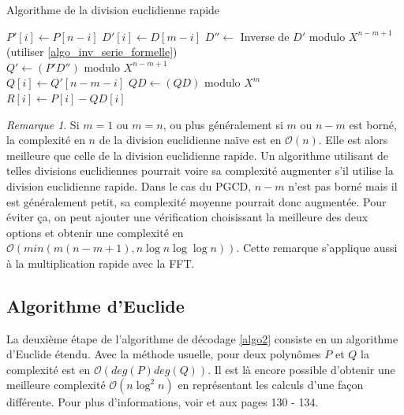 \documentclass{article}
\theoremstyle{definition}
\theoremstyle{remark}
\newtheorem{remark}{Remarque}
\begin{document}
\vspace{0.5cm}

\begin{algorithm}[H]
\label{algo_div_euc_rapide}
\caption{Algorithme de la division euclidienne rapide \cite{inv_formal_series}}
{
    $P'[i] \gets P[n-i]$
}
{
    $D'[i] \gets D[m-i]$
}
$D'' \gets$ Inverse de $D'$ modulo $X^{n-m+1}$ (utiliser \ref{algo_inv_serie_formelle})\\
$Q' \gets (P' D'')$ modulo $X^{n-m+1}$\\
{
    $Q[i] \gets Q'[n-m-i]$
}
$QD \gets (Q D)$ modulo $X^m$\\
{
    $R[i] \gets P[i] - QD[i]$
}
\end{algorithm}

\vspace{0.5cm}

\begin{remark}
    Si $m = 1$ ou $m = n$, ou plus généralement si $m$ ou $n-m$ est borné, la complexité en $n$ de la division euclidienne naïve est en $\mathcal{O}(n)$. Elle est alors meilleure que celle de la division euclidienne rapide. Un algorithme utilisant de telles divisions euclidiennes pourrait voire sa complexité augmenter s'il utilise la division euclidienne rapide. Dans le cas du PGCD, $n-m$ n'est pas borné mais il est généralement petit, sa complexité moyenne pourrait donc augmentée. Pour éviter ça, on peut ajouter une vérification choisissant la meilleure des deux options et obtenir une complexité en $\mathcal{O}(min(m(n-m+1), n\log{}n\log{}\log{}n))$. Cette remarque s'applique aussi à la multiplication rapide avec la FFT.
\end{remark}

\subsection{Algorithme d'Euclide}

La deuxième étape de l'algorithme de décodage \ref{algo2} consiste en un algorithme d'Euclide étendu. Avec la méthode usuelle, pour deux polynômes $P$ et $Q$ la complexité est en $\mathcal{O}(deg(P)deg(Q))$. Il est là encore possible d'obtenir une meilleure complexité $\mathcal{O}(n \log^2 n)$ en représentant les calculs d'une façon différente. Pour plus d'informations, voir \cite{grenet:hal-02942054} et \cite{moderncomp} aux pages 130 - 134. 
\end{document}
